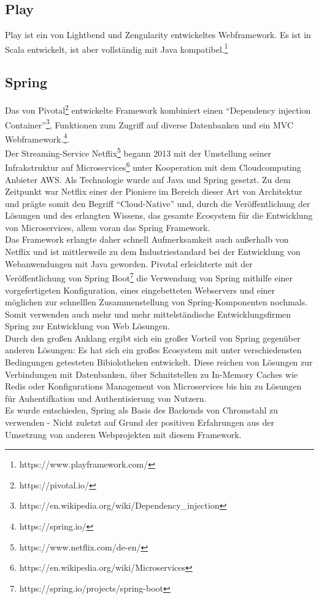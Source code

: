 \subsection{Play}
Play ist ein von Lightbend und Zengularity entwickeltes Webframework. Es ist in
Scala entwickelt, ist aber vollständig mit Java kompatibel.\footnote{https://www.playframework.com/}
\subsection{Spring}
Das von Pivotal\footnote{https://pivotal.io/} entwickelte Framework kombiniert einen ``Dependency injection
Container''\footnote{https://en.wikipedia.org/wiki/Dependency\_injection}, Funktionen zum Zugriff auf diverse Datenbanken und ein \ac{MVC}
Webframework.\footnote{https://spring.io/}.\\
Der Streaming-Service
Netflix\footnote{https://www.netflix.com/de-en/} begann 2013 mit der Umstellung
seiner Infrakstruktur auf Microservices\footnote{https://en.wikipedia.org/wiki/Microservices} unter Kooperation mit dem Cloudcomputing
Anbieter \ac{AWS}\cite{cloud-native-java}. Als Technologie wurde auf Java und
Spring gesetzt. Zu dem Zeitpunkt war Netflix einer
der Pioniere im Bereich dieser Art von Architektur und prägte somit den Begriff
``Cloud-Native'' und, durch die Veröffentlichung der Lösungen und des erlangten
Wissens, das gesamte Ecosystem für die Entwicklung von Microservices, allem
voran das Spring Framework.\\
Das Framework erlangte daher schnell Aufmerksamkeit auch außerhalb von Netflix
und ist mittlerweile zu dem Industriestandard bei der Entwicklung von
Webanwendungen mit Java geworden. Pivotal erleichterte mit der Veröffentlichung
von Spring Boot\footnote{https://spring.io/projects/spring-boot} die Verwendung
von Spring mithilfe einer vorgefertigeten Konfiguration, eines eingebetteten
Webservers und einer möglichen zur schnelllen Zusammenstellung von
Spring-Komponenten nochmals. Somit verwenden auch mehr und mehr mittelständische
Entwicklungsfirmen Spring zur Entwicklung von Web Lösungen.\\
Durch den großen Anklang ergibt sich ein großer Vorteil von Spring gegenüber
anderen Lösungen: Es hat sich ein großes Ecosystem mit unter verschiedensten
Bedingungen getesteten Bibiolotheken entwickelt. Diese reichen von Lösungen zur
Verbindungen mit Datenbanken, über Schnitstellen zu In-Memory Caches wie Redis
oder Konfigurations Management von Microservices bis hin zu Lösungen für
Auhentifkation und Authentisierung von Nutzern.\\
Es wurde entschieden, Spring als Basis des Backends von Chromstahl zu verwenden
- Nicht zuletzt auf Grund der positiven Erfahrungen aus der Umsetzung von
anderen Webprojekten mit diesem Framework.

